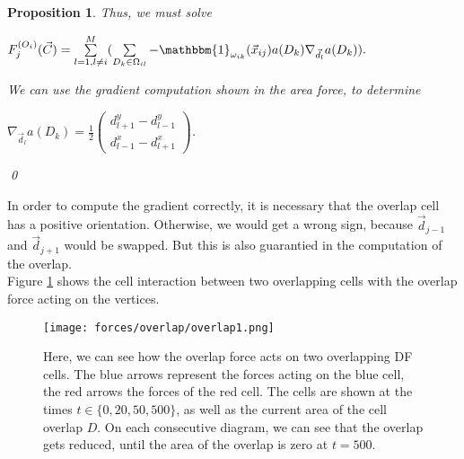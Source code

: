 \documentclass[a4paper,12pt,leqno]{article}
\theoremstyle{plain}
\newtheorem{proposition}[theorem]{Proposition}
\theoremstyle{remark}
\begin{document}
\begin{proposition}
	Thus, we must solve 
	\begin{center}
		$
		F_j^{(O_i)}(\vec{C}) = \sum\limits_{l=1, l\neq i}^{M} ( \sum\limits_{D_k \in \Omega_{il}} -\mathbbm{1}_{\omega_{ik}}(\vec{x}_{ij}) a(D_k) \nabla_{\vec{d}_l} a(D_k)).
		$
	\end{center}
	We can use the gradient computation shown in the area force, to determine
	\begin{center}
		$
		\nabla_{\vec{d}_l} a(D_k) = \frac{1}{2} 
		\begin{pmatrix}	d_{l+1}^{y} - d_{l-1}^{y} \\d_{l-1}^{x} - d_{l+1}^{x}	\end{pmatrix}
		$.
	\end{center}
	\qed
\end{proposition}
In order to compute the gradient correctly, it is necessary that the overlap cell has a positive orientation. Otherwise, we would get a wrong sign, because $\vec{d}_{j-1}$ and $\vec{d}_{j+1}$ would be swapped. But this is also guarantied in the computation of the overlap. \\ 
Figure \ref{fig:overlapForce} shows the cell interaction between two overlapping cells with the overlap force acting on the vertices. 
\begin{figure}[h!]
	\begin{center}
		\texttt{[image: forces/overlap/overlap1.png]}
		\caption{Here, we can see how the overlap force acts on two overlapping DF cells. The blue arrows represent the forces acting on the blue cell, the red arrows the forces of the red cell. The cells are shown at the times $t \in \{0, 20, 50, 500\}$, as well as the current area of the cell overlap $D$. On each consecutive diagram, we can see that the overlap gets reduced, until the area of the overlap is zero at $t=500$.  }
		\label{fig:overlapForce}
	\end{center}
\end{figure}
\end{document}
